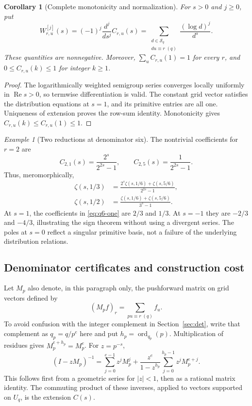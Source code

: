 \documentclass[11pt]{article}
\numberwithin{equation}{section}
\newtheorem{corollary}[theorem]{Corollary}
\theoremstyle{definition}
\theoremstyle{remark}
\newtheorem{example}[theorem]{Example}
\DeclareMathOperator{\ord}{ord}
\DeclareMathOperator{\Ree}{Re}
\begin{document}
\begin{corollary}[Complete monotonicity and normalization]\label{cor:monotone}
For $s>0$ and $j\ge0$, put
\begin{equation}\label{eq:W-definition}
 W_{r,u}^{[j]}(s)=(-1)^j\frac{d^j}{ds^j}C_{r,u}(s)
 =\sum_{\substack{d\in\mathcal S_q\\du\equiv r\;(q)}}
 \frac{(\log d)^j}{d^s}.
\end{equation}
These quantities are nonnegative. Moreover,
$\sum_u C_{r,u}(1)=1$ for every $r$, and
$0\le C_{r,u}(k)\le1$ for integer $k\ge1$.
\end{corollary}
\begin{proof}
The logarithmically weighted semigroup series converges locally
uniformly in $\Ree s>0$, so termwise differentiation is valid.
The constant grid vector satisfies the distribution equations at
$s=1$, and its primitive entries are all one. Uniqueness of extension
proves the row-sum identity. Monotonicity gives
$C_{r,u}(k)\le C_{r,u}(1)\le1$.
\end{proof}

\begin{example}[Two reductions at denominator six]\label{ex:q6}
The nontrivial coefficients for $r=2$ are
\[
 C_{2,1}(s)=\frac{2^s}{2^{2s}-1},\qquad
 C_{2,5}(s)=\frac1{2^{2s}-1}.
\]
Thus, meromorphically,
\begin{align}
 \zeta(s,1/3)&=
 \frac{2^s\zeta(s,1/6)+\zeta(s,5/6)}{2^{2s}-1},\label{eq:q6-one}\\
 \zeta(s,1/2)&=
 \frac{\zeta(s,1/6)+\zeta(s,5/6)}{3^s-1}.
 \label{eq:q6-two}
\end{align}
At $s=1$, the coefficients in \eqref{eq:q6-one} are $2/3$ and $1/3$.
At $s=-1$ they are $-2/3$ and $-4/3$, illustrating the sign theorem
without using a divergent series. The poles at $s=0$ reflect a
singular primitive basis, not a failure of the underlying distribution
relations.
\end{example}

\subsection{Denominator certificates and construction cost}
Let $M_p$ also denote, in this paragraph only, the pushforward matrix
on grid vectors defined by
\[
 (M_pf)_r=\sum_{pu\equiv r\;(q)}f_u.
\]
To avoid confusion with the integer complement in
Section~\ref{sec:det}, write that complement as $q_p=q/p^e$ here and
put $h_p=\ord_{q_p}(p)$. Multiplication of residues gives
$M_p^{e+h_p}=M_p^e$. For $z=p^{-s}$,
\begin{equation}\label{eq:operator-inverse}
 (I-zM_p)^{-1}
 =\sum_{j=0}^{e-1}z^jM_p^j
 +\frac{z^e}{1-z^{h_p}}\sum_{j=0}^{h_p-1}z^jM_p^{e+j}.
\end{equation}
This follows first from a geometric series for $|z|<1$, then as a
rational matrix identity. The commuting product of these inverses,
applied to vectors supported on $U_q$, is the extension $C(s)$.
\end{document}
